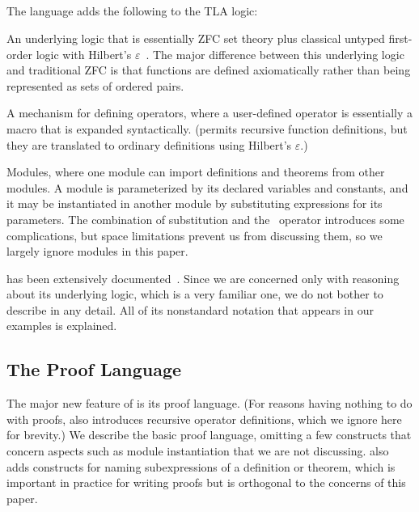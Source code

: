 \documentclass[a4paper]{easychair}
\begin{document}
\subsection{\tlaplus}

The \tlaplus language adds the following to the TLA logic:
\begin{icom}
\item An underlying logic that is essentially ZFC set theory plus
  classical untyped first-order logic with Hilbert's
  $\varepsilon$~\cite{leisenring:mathematical-logic}.  The major
  difference between this underlying logic and traditional ZFC is that
  functions are defined axiomatically rather than being represented as
  sets of ordered pairs.

\item A mechanism for defining operators, where a user-defined
  operator is essentially a macro that is expanded syntactically.
  (\tlaplus permits recursive function definitions, but they are
  translated to ordinary definitions using Hilbert's $\varepsilon$.)

\item Modules, where one module can import definitions
  and theorems from other modules.  A module is parameterized by its
  declared variables and constants, and it may be instantiated in another
  module by substituting expressions for its parameters. The
  combination of substitution and the \ENABLED\ operator introduces
  some complications, but space limitations prevent us from discussing
  them, so we largely ignore modules in this paper.
\end{icom}
\tlaplus has been extensively documented~\cite{lamport03tla}.  Since
we are concerned only with reasoning about its underlying logic, which
is a very familiar one, we do not bother to describe \tlaplus in any
detail.  All of its nonstandard notation that appears in our examples is
explained.

\subsection{The Proof Language}
\label{sec:proof-language.lang}

The major new feature of \tlatwo is its proof language.  (For reasons
having nothing to do with proofs, \tlatwo also introduces recursive
operator definitions, which we ignore here for brevity.)  We describe
the basic proof language, omitting a few constructs
that concern aspects such as module instantiation that we are not
discussing.  \tlatwo also adds constructs for naming subexpressions
of a definition or theorem, which is important in practice for writing
proofs but is orthogonal to the concerns of this paper.
\end{document}
